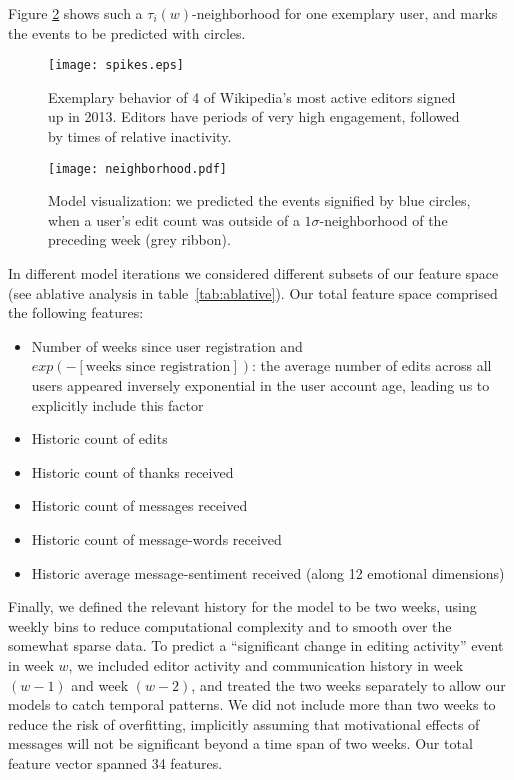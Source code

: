 \documentclass[letterpaper, 10 pt, conference]{ieeeconf}  %
\begin{document}
Figure \ref{fig:neighborhood} shows such a $\tau_{i}(w)$-neighborhood for one exemplary user, and marks the events to be predicted with circles.

   \begin{figure}[thpb]
      \centering
      \texttt{[image: spikes.eps]}
      \caption{Exemplary behavior of 4 of Wikipedia's most active editors signed up in 2013. Editors have periods of very high engagement, followed by times of relative inactivity.}
      \label{fig:spikes}
   \end{figure}


   \begin{figure}[thpb]
      \centering
      \texttt{[image: neighborhood.pdf]}
      \caption{Model visualization: we predicted the events signified by blue circles, when a user's edit count was outside of a $1\sigma$-neighborhood of the preceding week (grey ribbon).}
      \label{fig:neighborhood}
   \end{figure}


In different model iterations we considered different subsets of our feature space (see ablative analysis in table~\ref{tab:ablative}). Our total feature space comprised the following features:

\begin{itemize}
\item Number of weeks since user registration and $exp(- [\text{weeks since registration}])$: the average number of edits across all users appeared inversely exponential in the user account age, leading us to explicitly include this factor
\item Historic count of edits 
\item Historic count of thanks received 
\item Historic count of messages received 
\item Historic count of message-words received 
\item Historic average message-sentiment received (along 12 emotional dimensions)
\end{itemize}


Finally, we defined the relevant history for the model to be two weeks, using weekly bins to reduce computational complexity and to smooth over the somewhat sparse data. To predict a ``significant change in editing activity'' event in week $w$, we included editor activity and communication history in week $(w-1)$ and week $(w-2)$, and treated the two weeks separately to allow our models to catch temporal patterns. We did not include more than two weeks to reduce the risk of overfitting, implicitly assuming that motivational effects of messages will not be significant beyond a time span of two weeks. Our total feature vector spanned 34 features.
\end{document}

